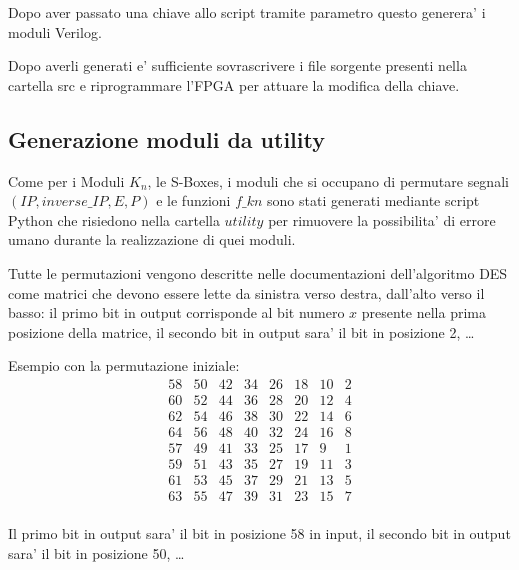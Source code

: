 \documentclass[a4paper]{article}
\begin{document}
Dopo aver passato una chiave allo script tramite parametro questo generera' i moduli Verilog.

Dopo averli generati e' sufficiente sovrascrivere i file sorgente presenti nella cartella src e riprogrammare l'FPGA per attuare la modifica della chiave.

\subsection{Generazione moduli da utility}
Come per i Moduli $K_n$, le S-Boxes, i moduli che si occupano di permutare segnali $(IP, inverse\_IP, E, P)$ e le funzioni $f\_kn$ sono stati generati mediante script Python che risiedono nella cartella $utility$ per rimuovere la possibilita' di errore umano durante la realizzazione di quei moduli.

Tutte le permutazioni vengono descritte nelle documentazioni dell'algoritmo DES come matrici che devono essere lette da sinistra verso destra, dall'alto verso il basso: il primo bit in output corrisponde al bit numero $x$ presente nella prima posizione della matrice, il secondo bit in output sara' il bit in posizione 2, \dots

Esempio con la permutazione iniziale:
$$
\begin{matrix}
58 & 50 & 42 & 34 & 26 & 18 & 10 & 2 \\
60 & 52 & 44 & 36 & 28 & 20 & 12 & 4 \\
62 & 54 & 46 & 38 & 30 & 22 & 14 & 6 \\
64 & 56 & 48 & 40 & 32 & 24 & 16 & 8 \\
57 & 49 & 41 & 33 & 25 & 17 &  9 & 1 \\
59 & 51 & 43 & 35 & 27 & 19 & 11 & 3 \\
61 & 53 & 45 & 37 & 29 & 21 & 13 & 5 \\
63 & 55 & 47 & 39 & 31 & 23 & 15 & 7 \\
\end{matrix}
$$

Il primo bit in output sara' il bit in posizione 58 in input, il secondo bit in output sara' il bit in posizione 50, \dots
{}

\end{document}
